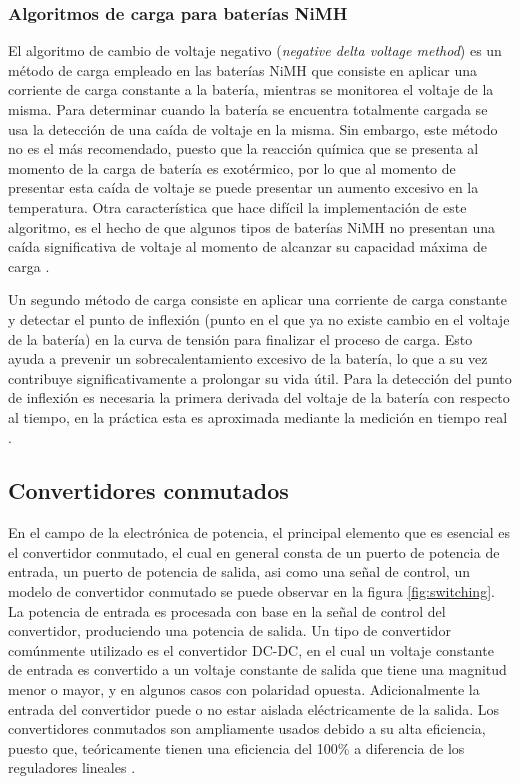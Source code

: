 \subsubsection*{Algoritmos de carga para baterías NiMH}

El algoritmo de cambio de voltaje negativo (\textit{negative delta voltage method}) es un método de carga empleado
en las baterías NiMH que consiste en aplicar una corriente de carga constante a la batería, mientras se monitorea 
el voltaje de la misma. Para determinar cuando la batería se encuentra totalmente cargada se usa la detección de una 
caída de voltaje en la misma. Sin embargo, este método no es el más recomendado, puesto que la reacción química que se 
presenta al momento de la carga de batería es exotérmico, por lo que al momento de presentar esta caída de voltaje se 
puede presentar un aumento excesivo en la temperatura. Otra característica que hace difícil la implementación de este 
algoritmo, es el hecho de que algunos tipos de baterías NiMH no presentan una caída significativa de voltaje al momento
de alcanzar su capacidad máxima de carga \cite{nicolai_nickel-cadmium_1995}.

Un segundo método de carga consiste en aplicar una corriente de carga constante y 
detectar el punto de inflexión (punto en el que ya no existe cambio
en el voltaje de la batería) en la curva de tensión para finalizar el proceso de carga.
Esto ayuda a prevenir un sobrecalentamiento
excesivo de la batería, lo que a su vez contribuye significativamente a prolongar su vida útil. 
Para la detección del punto de inflexión es necesaria la primera derivada del voltaje de la batería con respecto 
al tiempo, en la práctica esta es aproximada mediante la medición en tiempo real \cite{nicolai_nickel-cadmium_1995}.

\subsection*{Convertidores conmutados}

En el campo de la electrónica de potencia, el principal elemento que es esencial es el convertidor conmutado, el cual
en general consta de un puerto de potencia de entrada, un puerto de potencia de salida, asi como una señal de control,
un modelo de convertidor conmutado se puede observar en la figura \ref{fig:switching}. La potencia de entrada es procesada
con base en la señal de control del convertidor, produciendo una potencia de salida. Un tipo de convertidor comúnmente utilizado
es el convertidor DC-DC, en el cual un voltaje constante de entrada es convertido a un voltaje constante de salida que tiene 
una magnitud menor o mayor, y en algunos casos con polaridad opuesta. Adicionalmente la entrada del convertidor puede o no estar  aislada eléctricamente de la salida. Los convertidores conmutados son
ampliamente usados debido a su alta eficiencia, puesto que, teóricamente tienen una eficiencia del 
100\% a diferencia de los reguladores lineales \cite{erickson_fundamentals_2020}.

